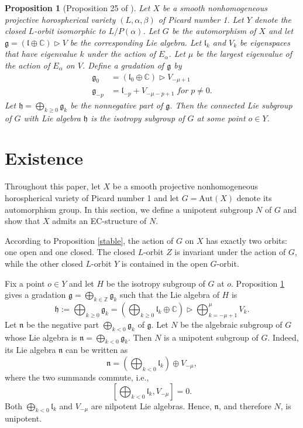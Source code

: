 \documentclass{amsart}
\newtheorem{proposition}[theorem]{Proposition}
\theoremstyle{definition}
\theoremstyle{remark}
\newcommand{\Z}{\mathbb{Z}}
\newcommand{\C}{\mathbb{C}}
\newcommand{\g}{\mathfrak{g}}
\newcommand{\n}{\mathfrak{n}}
\begin{document}
\begin{proposition}[Proposition 25 of \cite{K}]
\label{Kim}
Let \(X\) be a smooth nonhomogeneous projective horospherical variety \((L, \alpha, \beta)\) of Picard number 1. Let $Y$ denote the closed $L$-orbit isomorphic to $L/P(\alpha)$. Let $G$ be the automorphism of $X$ and let $\g = (\mathfrak{l} \oplus \C) \rhd V$ be the corresponding Lie algebra. Let \(\mathfrak{l}_k\) and \(V_k\) be eigenspaces that have eigenvalue \(k\) under the action of \(E_\alpha\). Let \(\mu\) be the largest eigenvalue of the action of \(E_\alpha\) on \(V\). Define a gradation of $\g$ by
\begin{align*}
\mathfrak{g}_{0} & = (\mathfrak{l}_{0} \oplus \C) \rhd V_{-\mu + 1}\\
\mathfrak{g}_{-p} & = \mathfrak{l}_{-p} + V_{-\mu-p+1} \; for \; p \neq 0.
\end{align*}
Let $\mathfrak{h} = \bigoplus_{k \geq 0} \g_k$ be the nonnegative part of $\g$. Then the connected Lie subgroup of $G$ with Lie algebra $\mathfrak{h}$ is the isotropy subgroup of $G$ at some point $o \in Y$.
\end{proposition}


\section{Existence}
\label{sec:Existence}

Throughout this paper, let $X$ be a smooth projective nonhomogeneous horospherical variety of Picard number 1 and let \(G=\text{Aut}(X)\) denote its automorphism group. In this section, we define a unipotent subgroup $N$ of $G$ and show that $X$ admits an EC-structure of $N$.

According to Proposition \ref{stable}, the action of $G$ on $X$ has exactly two orbits: one open and one closed. The closed $L$-orbit $Z$ is invariant under the action of $G$, while the other closed $L$-orbit $Y$ is contained in the open $G$-orbit. 

Fix a point \(o \in Y\) and let $H$ be the isotropy subgroup of $G$ at $o$. Proposition \ref{Kim} gives a gradation $\g = \bigoplus_{k \in \Z} \g_k$ such that the Lie algebra of $H$ is 
\[
\mathfrak{h} := \bigoplus_{k \geq 0} \g_k = (\bigoplus_{k\geq0} \mathfrak{l}_k \oplus \C) \rhd \bigoplus_{k = -\mu+1}^\mu V_k.
\]
Let $\n$ be the negative part $\bigoplus_{k < 0} \mathfrak{g}_k$ of $\g$. Let $N$ be the algebraic subgroup of $G$ whose Lie algebra is $\n = \bigoplus_{k < 0} \mathfrak{g}_k$. Then $N$ is a unipotent subgroup of $G$. Indeed, its Lie algebra $\n$ can be written as
\[\n = (\bigoplus_{k < 0} \mathfrak{l}_k) \oplus V_{-\mu},\]
where the two summands commute, i.e., 
\[[\bigoplus_{k < 0} \mathfrak{l}_k, V_{-\mu}] = 0.\]
Both $\bigoplus_{k < 0} \mathfrak{l}_k$ and $V_{-\mu}$ are nilpotent Lie algebras. Hence, $\n$, and therefore $N$, is unipotent.
\end{document}
